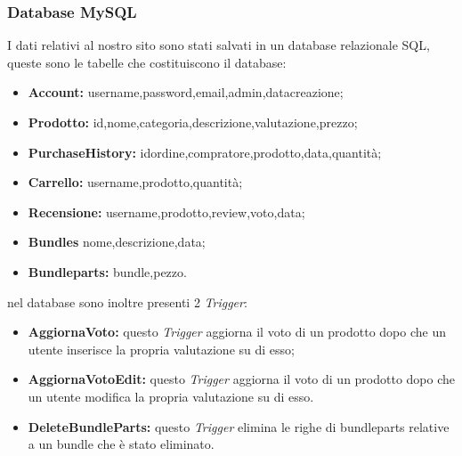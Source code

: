 \subsubsection{Database MySQL}
I dati relativi al nostro sito sono stati salvati in un database relazionale SQL, queste sono le tabelle che costituiscono il database:
\begin{itemize}
    \item \textbf{Account:} username,password,email,admin,datacreazione;
    \item \textbf{Prodotto:} id,nome,categoria,descrizione,valutazione,prezzo;
    \item \textbf{PurchaseHistory:} idordine,compratore,prodotto,data,quantità;
    \item \textbf{Carrello:} username,prodotto,quantità;
    \item \textbf{Recensione:} username,prodotto,review,voto,data;
    \item \textbf{Bundles} nome,descrizione,data;
    \item \textbf{Bundleparts:} bundle,pezzo.	
\end{itemize}
nel database sono inoltre presenti 2 \emph{Trigger}:
\begin{itemize}
	\item \textbf{AggiornaVoto:} questo \emph{Trigger} aggiorna il voto di un prodotto dopo che un utente inserisce la propria valutazione su di esso;
	\item \textbf{AggiornaVotoEdit:} questo \emph{Trigger} aggiorna il voto di un prodotto dopo che un utente modifica la propria valutazione su di esso.
	\item \textbf{DeleteBundleParts:} questo \emph{Trigger} elimina le righe di bundleparts relative a un bundle che è stato eliminato.
\end{itemize}

